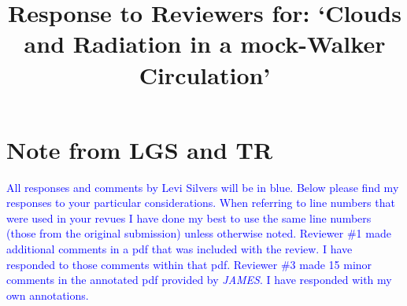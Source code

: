 \documentclass[draft]{agujournal2019}
\begin{document}
%
%


\title{Response to Reviewers for: `Clouds and Radiation in a mock-Walker Circulation'}

%
%















\section{Note from LGS and TR}

\textcolor{blue}{All responses and comments by Levi Silvers will be in blue.  Below please find my responses to your particular considerations.  When referring to line numbers that were used in your revues I have done my best to use the same line numbers (those from the original submission) unless otherwise
noted.  Reviewer \#1 made additional comments in a pdf that was included with the review.  I have responded to those comments within that pdf.  Reviewer \#3 made 15 minor comments in the annotated pdf provided by \textit{JAMES}.  I have responded with my own annotations. }
\end{document}
